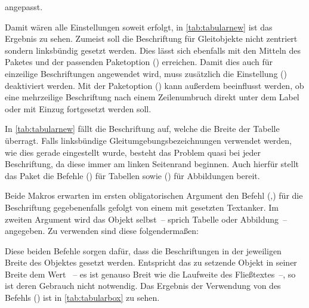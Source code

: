 \documentclass[%
  english,ngerman,%
  cdgeometry=no,DIV=12,%
  cd=false,cdfont=false,cdtitle=true,%
  headings=normal,%
  automark,%
  listof=toc,%
]{tudscrartcl}
\begin{document}
angepasst.
%
\begin{Preamble*}
\end{Preamble*}
%
\begin{table}
\end{table}%
%
Damit wären alle Einstellungen soweit erfolgt, in \autoref{tab:tabularnew} ist 
das Ergebnis zu sehen. Zumeist soll die Beschriftung für Gleitobjekte nicht 
zentriert sondern linksbündig gesetzt werden. Dies lässt sich ebenfalls mit den 
Mitteln des Paketes  und der passenden Paketoption 
() erreichen. Damit dies auch für 
einzeilige Beschriftungen angewendet wird, muss zusätzlich die Einstellung 
() deaktiviert werden. Mit der 
Paketoption () kann außerdem beeinflusst 
werden, ob eine mehrzeilige Beschriftung nach einem Zeilenumbruch direkt unter 
dem Label oder mit Einzug fortgesetzt werden soll.
%
\begin{Preamble*}
\captionsetup{singlelinecheck=off,format=hang,justification=raggedright}
\end{Preamble*}
%
In \autoref{tab:tabularnew} fällt die Beschriftung auf, welche die Breite der 
Tabelle überragt. Falls linksbündige Gleitumgebungsbezeichnungen verwendet 
werden, wie dies gerade eingestellt wurde, besteht das Problem quasi bei jeder 
Beschriftung, da diese immer am linken Seitenrand beginnen. Auch hierfür stellt 
das Paket  die Befehle () 
für Tabellen sowie () für Abbildungen bereit. 

Beide Makros erwarten im ersten obligatorischen Argument den Befehl 
(,) für die Beschriftung 
gegebenenfalls gefolgt von einem mit  gesetzten Textanker. Im 
zweiten Argument wird das Objekt selbst~-- sprich Tabelle oder Abbildung~-- 
angegeben. Zu verwenden sind diese folgendermaßen:
%
%
Diese beiden Befehle sorgen dafür, dass die Beschriftungen in der jeweiligen 
Breite des Objektes gesetzt werden. Entspricht das zu setzende Objekt in seiner 
Breite dem Wert ~-- es ist genauso Breit wie die Laufweite 
des Fließtextes~--, so ist deren Gebrauch nicht notwendig. Das Ergebnis der 
Verwendung von des Befehls () ist in 
\autoref{tab:tabularbox} zu sehen.
\end{document}
